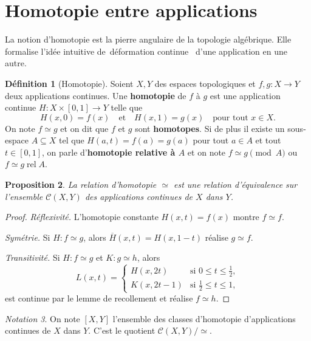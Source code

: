 \documentclass[12pt,a4paper,openany]{book}
\theoremstyle{definition}
\newtheorem{definition}{Définition}[chapter]
\theoremstyle{plain}
\newtheorem{proposition}[definition]{Proposition}
\theoremstyle{remark}
\newtheorem{notation}[definition]{Notation}
\newcommand{\rel}{\operatorname{rel}}
\providecommand{\og}{\guillemotleft\,}
\providecommand{\fg}{\,\guillemotright}
\begin{document}
\section{Homotopie entre applications}\label{sec:homotopie}

La notion d'homotopie est la pierre angulaire de la topologie algébrique. Elle
formalise l'idée intuitive de \og déformation continue \fg{} d'une application en
une autre.

\begin{definition}[Homotopie]\label{def:homotopie}
Soient $X, Y$ des espaces topologiques et $f, g : X \to Y$ deux applications
continues. Une \textbf{homotopie} de $f$ à $g$ est une application continue
$H : X \times [0,1] \to Y$ telle que
\[
H(x, 0) = f(x) \quad \text{et} \quad H(x, 1) = g(x) \quad \text{pour tout } x \in X.
\]
On note $f \simeq g$\index{$\simeq$} et on dit que $f$ et $g$ sont
\textbf{homotopes}. Si de plus il existe un sous-espace $A \subseteq X$ tel que
$H(a, t) = f(a) = g(a)$ pour tout $a \in A$ et tout $t \in [0,1]$, on parle
d'\textbf{homotopie relative à $A$} et on note $f \simeq g \pmod{A}$ ou
$f \simeq g \rel A$.
\end{definition}

\begin{proposition}\label{prop:homotopie-equivalence}
La relation d'homotopie $\simeq$ est une relation d'équivalence sur l'ensemble
$\mathcal{C}(X, Y)$ des applications continues de $X$ dans $Y$.
\end{proposition}

\begin{proof}
\emph{Réflexivité.} L'homotopie constante $H(x,t) = f(x)$ montre $f \simeq f$.

\emph{Symétrie.} Si $H : f \simeq g$, alors $\overline{H}(x,t) = H(x, 1-t)$
réalise $g \simeq f$.

\emph{Transitivité.} Si $H : f \simeq g$ et $K : g \simeq h$, alors
\[
L(x,t) = \begin{cases} H(x, 2t) & \text{si } 0 \leqslant t \leqslant \tfrac{1}{2}, \\
K(x, 2t-1) & \text{si } \tfrac{1}{2} \leqslant t \leqslant 1,
\end{cases}
\]
est continue par le lemme de recollement et réalise $f \simeq h$.
\end{proof}

\begin{notation}\label{not:classes-homotopie}
On note $[X, Y]$\index{$[X,Y]$} l'ensemble des classes d'homotopie
d'applications continues de $X$ dans $Y$. C'est le quotient
$\mathcal{C}(X,Y)/{\simeq}$.
\end{notation}
\end{document}
